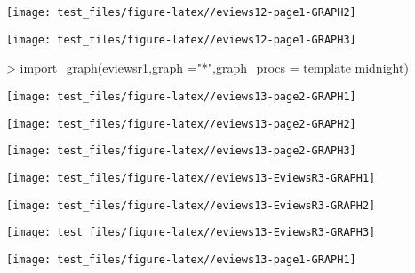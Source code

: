 \documentclass[
]{article}
\newenvironment{Shaded}{\begin{snugshade}}{\end{snugshade}}
\newcommand{\AttributeTok}[1]{\textcolor[rgb]{0.77,0.63,0.00}{#1}}
\newcommand{\FunctionTok}[1]{\textcolor[rgb]{0.00,0.00,0.00}{#1}}
\newcommand{\NormalTok}[1]{#1}
\newcommand{\SpecialCharTok}[1]{\textcolor[rgb]{0.00,0.00,0.00}{#1}}
\newcommand{\StringTok}[1]{\textcolor[rgb]{0.31,0.60,0.02}{#1}}
\begin{document}
\begin{center}\texttt{[image: test\_files/figure-latex//eviews12-page1-GRAPH2]} \end{center}

\begin{center}\texttt{[image: test\_files/figure-latex//eviews12-page1-GRAPH3]} \end{center}

\begin{Shaded}
\begin{Highlighting}[]
\SpecialCharTok{\textgreater{}} \FunctionTok{import\_graph}\NormalTok{(}\StringTok{\textquotesingle{}eviewsr1\textquotesingle{}}\NormalTok{,}\AttributeTok{graph =}\StringTok{"*"}\NormalTok{,}\AttributeTok{graph\_procs =} \StringTok{\textquotesingle{}template midnight\textquotesingle{}}\NormalTok{)}
\end{Highlighting}
\end{Shaded}

\begin{center}\texttt{[image: test\_files/figure-latex//eviews13-page2-GRAPH1]} \end{center}

\begin{center}\texttt{[image: test\_files/figure-latex//eviews13-page2-GRAPH2]} \end{center}

\begin{center}\texttt{[image: test\_files/figure-latex//eviews13-page2-GRAPH3]} \end{center}

\begin{center}\texttt{[image: test\_files/figure-latex//eviews13-EviewsR3-GRAPH1]} \end{center}

\begin{center}\texttt{[image: test\_files/figure-latex//eviews13-EviewsR3-GRAPH2]} \end{center}

\begin{center}\texttt{[image: test\_files/figure-latex//eviews13-EviewsR3-GRAPH3]} \end{center}

\begin{center}\texttt{[image: test\_files/figure-latex//eviews13-page1-GRAPH1]} \end{center}
\end{document}
